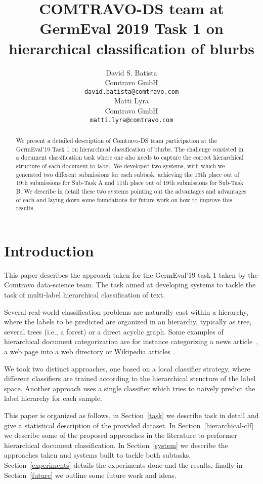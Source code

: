 \documentclass[11pt,a4paper]{article}
\title{COMTRAVO-DS team at GermEval 2019 Task 1 on hierarchical classification of blurbs}
\author{David S. Batista \\
  Comtravo GmbH \\
  {\tt david.batista@comtravo.com} \\\And
  Matti Lyra \\
  Comtravo GmbH \\
  {\tt matti.lyra@comtravo.com} \\}
\date{}
\begin{document}
\maketitle

\begin{abstract}
We present a detailed description of Comtravo-DS team participation at the
GermEval'19 Task 1 on hierarchical classification of blurbs. The challenge
consisted in a document classification task where one also needs to capture
the correct hierarchical structure of each document to label. We developed two
systems, with which we generated two different submissions for each subtask,
achieving the 13th place out of 19th submissions for Sub-Task A and 11th place
out of 19th submissions for Sub-Task B. We describe in detail these two
systems pointing out the advantages and advantages of each and laying down some
foundations for future work on how to improve this results.
\end{abstract}




\section{Introduction}

This paper describes the approach taken for the GermEval'19 task 1 taken by the
Comtravo data-science team. The task aimed at developing systems to tackle the
task of multi-label hierarchical classification of text.

Several real-world classification problems are naturally cast within a hierarchy,
where the labels to be predicted are organized in an hierarchy, typically as
tree, several trees (i.e., a forest) or a direct acyclic graph. Some examples
of hierarchical document categorization are for instance categorizing a news
article~\cite{Lewis:2004:RNB:1005332.1005345}, a web page into a web directory
or Wikipedia articles~\cite{PartalasKBAPGAA15}.

We took two distinct approaches, one based on a local classifier strategy, where different classifiers
are trained according to the hierarchical structure of the label space. Another
approach uses a single classifier which tries to naively predict the label
hierarchy for each sample.

This paper is organized as follows, in Section~\ref{task} we describe task in
detail and give a statistical description of the provided dataset. In Section~\ref{hierarchical-clf}
we describe some of the proposed approaches in the literature to performer
hierarchical document classification. In Section~\ref{system} we describe
the approaches taken and systems built to tackle both subtasks. Section~\ref{experiments}
details the experiments done and the results, finally in Section~\ref{future} we
outline some future work and ideas.
\end{document}
